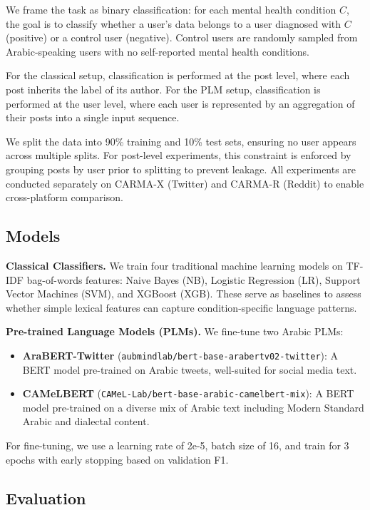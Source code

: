 \documentclass[11pt]{article}
\begin{document}
We frame the task as binary classification: for each mental health condition $C$, the goal is to classify whether a user's data belongs to a user diagnosed with $C$ (positive) or a control user (negative). Control users are randomly sampled from Arabic-speaking users with no self-reported mental health conditions.

For the classical setup, classification is performed at the post level, where each post inherits the label of its author. For the PLM setup, classification is performed at the user level, where each user is represented by an aggregation of their posts into a single input sequence.

We split the data into 90\% training and 10\% test sets, ensuring no user appears across multiple splits. For post-level experiments, this constraint is enforced by grouping posts by user prior to splitting to prevent leakage. All experiments are conducted separately on CARMA-X (Twitter) and CARMA-R (Reddit) to enable cross-platform comparison.


\subsection{Models}
\label{subsec:models}

\textbf{Classical Classifiers.} We train four traditional machine learning models on TF-IDF bag-of-words features: Naive Bayes (NB), Logistic Regression (LR), Support Vector Machines (SVM), and XGBoost (XGB). These serve as baselines to assess whether simple lexical features can capture condition-specific language patterns.

\textbf{Pre-trained Language Models (PLMs).} We fine-tune two Arabic PLMs:
\begin{itemize}
    \item \textbf{AraBERT-Twitter} (\texttt{aubmindlab/bert-base-arabertv02-twitter}): A BERT model pre-trained on Arabic tweets, well-suited for social media text.
    \item \textbf{CAMeLBERT} (\texttt{CAMeL-Lab/bert-base-arabic-camelbert-mix}): A BERT model pre-trained on a diverse mix of Arabic text including Modern Standard Arabic and dialectal content.
\end{itemize}
For fine-tuning, we use a learning rate of 2e-5, batch size of 16, and train for 3 epochs with early stopping based on validation F1.

\subsection{Evaluation}
\label{subsec:eval}
\end{document}
